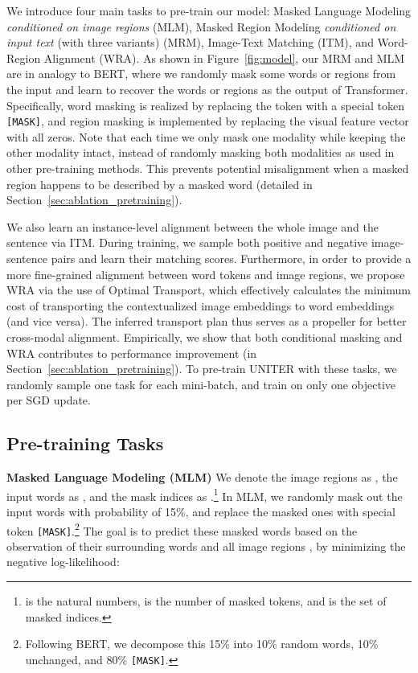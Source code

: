 \documentclass[runningheads]{llncs}
\begin{document}
We introduce four main tasks to pre-train our model: Masked Language Modeling \emph{conditioned on image regions} (MLM), Masked Region Modeling \emph{conditioned on input text} (with three variants) (MRM), Image-Text Matching (ITM), and Word-Region Alignment (WRA). As shown in Figure~\ref{fig:model},
our MRM and MLM are in analogy to BERT, where we randomly mask some words or regions from the input and learn to recover the words or regions as the output of Transformer.
Specifically, word masking is realized by replacing the token with a special token \texttt{[MASK]}, and region masking is implemented by replacing the visual feature vector with all zeros.
Note that each time we only mask one modality while keeping the other modality intact, instead of randomly masking both modalities as used in other pre-training methods.
This prevents potential misalignment when a masked region happens to be described by a masked word (detailed in Section~\ref{sec:ablation_pretraining}).

We also learn an instance-level alignment between the whole image and the sentence via ITM. During training, we sample both positive and negative image-sentence pairs and learn their matching scores.
Furthermore, in order to provide a more fine-grained alignment between word tokens and image regions, we propose WRA via the use of Optimal Transport, which effectively calculates the minimum cost of transporting the contextualized image embeddings to word embeddings (and vice versa). The inferred transport plan thus serves as a propeller for better cross-modal alignment.
Empirically, we show that both conditional masking and WRA contributes to performance improvement (in Section~\ref{sec:ablation_pretraining}).
To pre-train UNITER with these tasks, we randomly sample one task for each mini-batch, and train on only one objective per SGD update.





\subsection{Pre-training Tasks}\label{subsec:tasks}

\noindent \textbf{Masked Language Modeling (MLM)} 
We denote the image regions as , the input words as , and the mask indices as .\footnote{ is the natural numbers,  is the number of masked tokens, and  is the set of masked indices.}
In MLM, we randomly mask out the input words with probability of 15\%, and replace the masked ones  with special token \texttt{[MASK]}.\footnote{Following BERT, we decompose this 15\% into 10\% random words, 10\% unchanged, and 80\% \texttt{[MASK]}.}
The goal is to predict these masked words based on the observation of their surrounding words  and all image regions , by minimizing the negative log-likelihood:
\end{document}
